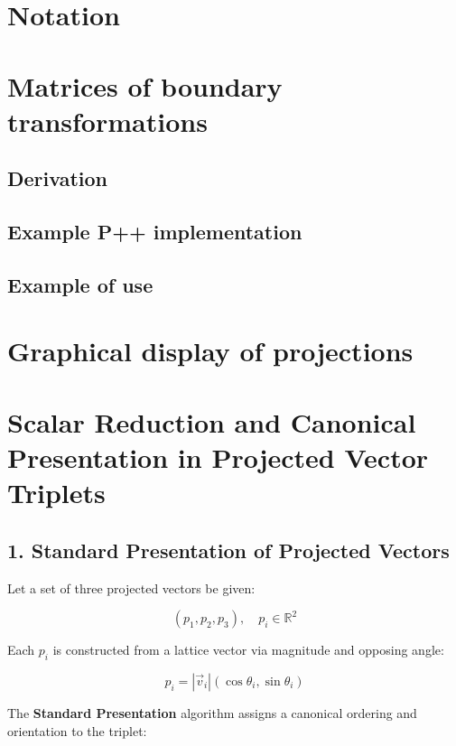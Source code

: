 \documentclass[preprint]{iucr}              %
\numberwithin{equation}{section}
\begin{document}
	
	
	\section{Notation}
	
	
	
	
	\section{Matrices of boundary transformations}
	
	
	\subsection{Derivation}
	
	
	\subsection{Example P++ implementation}
	
	
	
	
	\subsection{Example of use}
	
	
	\section{Graphical display of projections}
	
	\section{Scalar Reduction and Canonical Presentation in Projected Vector Triplets}
	
	\subsection{1. Standard Presentation of Projected Vectors}
	
	Let a set of three projected vectors be given:
	
	
	\[
	(p_1, p_2, p_3), \quad p_i \in \mathbb{R}^2
	\]
	
	
	Each \( p_i \) is constructed from a lattice vector via magnitude and opposing angle:
	
	
	\[
	p_i = |\vec{v}_i| (\cos \theta_i, \sin \theta_i)
	\]
	
	
	
	The \textbf{Standard Presentation} algorithm assigns a canonical ordering and orientation to the triplet:
	
\end{document}
